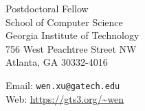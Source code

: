 \begin{minipage}[t]{0.45\textwidth}
  Postdoctoral Fellow\\
  School of Computer Science\\
  Georgia Institute of Technology\\
  756 West Peachtree Street NW\\
  Atlanta, GA 30332-4016
\end{minipage}
\begin{minipage}[t]{0.45\textwidth}
  Email: \texttt{wen.xu@gatech.edu} \\
  Web: \url{https://gts3.org/~wen} \\
\end{minipage}
